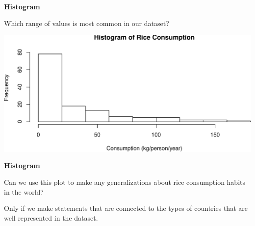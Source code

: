 \documentclass[ignorenonframetext,]{beamer}
\newenvironment{Shaded}{\begin{snugshade}}{\end{snugshade}}
\newcommand{\DataTypeTok}[1]{\textcolor[rgb]{0.13,0.29,0.53}{#1}}
\newcommand{\KeywordTok}[1]{\textcolor[rgb]{0.13,0.29,0.53}{\textbf{#1}}}
\newcommand{\NormalTok}[1]{#1}
\newcommand{\OperatorTok}[1]{\textcolor[rgb]{0.81,0.36,0.00}{\textbf{#1}}}
\newcommand{\StringTok}[1]{\textcolor[rgb]{0.31,0.60,0.02}{#1}}
\begin{document}
\begin{frame}[fragile]{}
\protect\hypertarget{section-12}{}

\textbf{\large Histogram}

Which range of values is most common in our dataset?

\vspace{1ex}\scriptsize

\begin{Shaded}
\end{Shaded}

\includegraphics{lecture-03_files/figure-beamer/unnamed-chunk-6-1.pdf}

\end{frame}

\begin{frame}{}
\protect\hypertarget{section-13}{}

\textbf{\large Histogram}

Can we use this plot to make any generalizations about rice consumption
habits in the world?\pause

\vspace{2ex}

\color{coralred} Only if we make statements that are connected to the
types of countries that are well represented in the dataset.

\end{frame}
\end{document}
